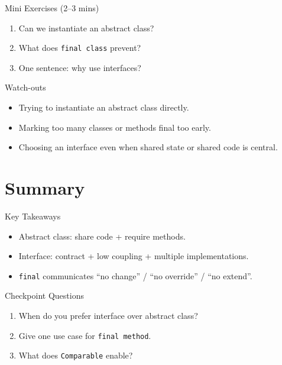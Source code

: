 \documentclass{beamer}
\begin{document}
\begin{frame}{Mini Exercises (2--3 mins)}
  \begin{enumerate}[<+->]
    \item Can we instantiate an abstract class?
    \item What does \texttt{final class} prevent?
    \item One sentence: why use interfaces?
  \end{enumerate}
  \slidesources{\OOPSUnitIISources}
\end{frame}

\begin{frame}{Watch-outs}
\begin{itemize}[<+->]
  \item Trying to instantiate an abstract class directly.
  \item Marking too many classes or methods final too early.
  \item Choosing an interface even when shared state or shared code is central.
\end{itemize}
  \slidesources{\OOPSUnitIISources}
\end{frame}

\section{Summary}
\label{sec:summary}

\begin{frame}{Key Takeaways}
  \begin{itemize}[<+->]
    \item Abstract class: share code + require methods.
    \item Interface: contract + low coupling + multiple implementations.
    \item \texttt{final} communicates ``no change'' / ``no override'' / ``no extend''.
  \end{itemize}
  \slidesources{\OOPSUnitIISources}
\end{frame}

\begin{frame}{Checkpoint Questions}
  \begin{enumerate}[<+->]
    \item When do you prefer interface over abstract class?
    \item Give one use case for \texttt{final method}.
    \item What does \texttt{Comparable} enable?
  \end{enumerate}
  \slidesources{\OOPSUnitIISources}
\end{frame}
\end{document}
